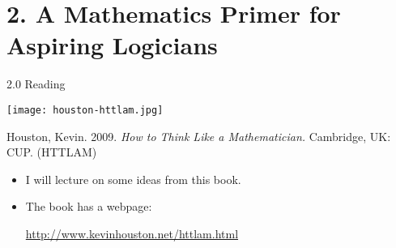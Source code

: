 \section{2. A Mathematics Primer for Aspiring Logicians}
\begin{frame}{2.0 Reading}

  \begin{center}
	\texttt{[image: houston-httlam.jpg]}
  \end{center}

  Houston, Kevin. 2009. \emph{How to Think Like a Mathematician.} Cambridge, UK: CUP. (HTTLAM)

  \begin{itemize}

	\item I will lecture on some ideas from this book.

	\item The book has a webpage:

		  \begin{center}
			\url{http://www.kevinhouston.net/httlam.html}
		  \end{center}

\end{itemize}

\end{frame}


